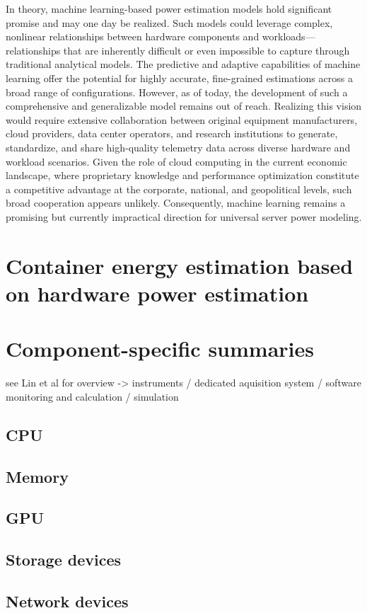 In theory, machine learning-based power estimation models hold significant promise and may one day be realized. Such models could leverage complex, nonlinear relationships between hardware components and workloads—relationships that are inherently difficult or even impossible to capture through traditional analytical models. The predictive and adaptive capabilities of machine learning offer the potential for highly accurate, fine-grained estimations across a broad range of configurations. However, as of today, the development of such a comprehensive and generalizable model remains out of reach. Realizing this vision would require extensive collaboration between original equipment manufacturers, cloud providers, data center operators, and research institutions to generate, standardize, and share high-quality telemetry data across diverse hardware and workload scenarios. Given the role of cloud computing in the current economic landscape, where proprietary knowledge and performance optimization constitute a competitive advantage at the corporate, national, and geopolitical levels, such broad cooperation appears unlikely. Consequently, machine learning remains a promising but currently impractical direction for universal server power modeling.



\section{Container energy estimation based on hardware power estimation}


\section{Component-specific summaries}
\label{sec:component_specific_summaries}

see Lin et al for overview -> instruments / dedicated aquisition system / software monitoring and calculation / simulation

\subsection{CPU}

\subsection{Memory}

\subsection{GPU}

\subsection{Storage devices}

\subsection{Network devices}